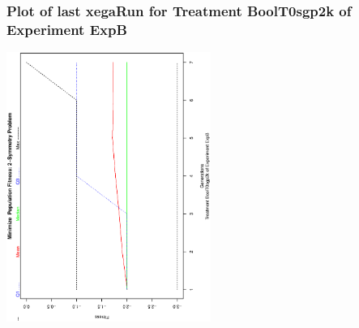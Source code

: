  \begin{frame}
 \frametitle{ Plot of last xegaRun for Treatment BoolT0sgp2k of Experiment ExpB }
 \begin{center}
\includegraphics[width=0.5\textwidth, angle=-90]
{ExpBPlotPopStatsFigure000.eps}
 \end{center}
 \label{report/ExpBPlotPopStatsFigure000.eps}  
 \end{frame}


